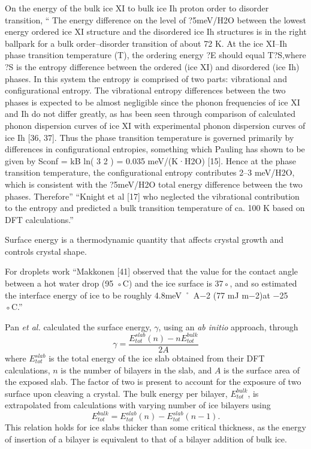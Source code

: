 On the energy of the bulk ice XI to bulk ice Ih proton order to
disorder transition, `` The energy difference on the level of
?5meV/H2O between the lowest energy ordered ice XI structure and the
disordered ice Ih structures is in the right ballpark for a bulk
order–disorder transition of about 72 K. At the ice XI–Ih phase
transition temperature (T), the ordering energy ?E should equal
T?S,where ?S is the entropy difference between the ordered (ice XI)
and disordered (ice Ih) phases. In this system the entropy is
comprised of two parts: vibrational and configurational entropy. The
vibrational entropy differences between the two phases is expected to
be almost negligible since the phonon frequencies of ice XI and Ih do
not differ greatly, as has been seen through comparison of calculated
phonon dispersion curves of ice XI with experimental phonon dispersion
curves of ice Ih [36, 37]. Thus the phase transition temperature is
governed primarily by differences in configurational entropies,
something which Pauling has shown to be given by Sconf = kB ln( 3 2 )
= 0.035 meV/(K·H2O) [15].  Hence at the phase transition temperature,
the configurational entropy contributes 2–3 meV/H2O, which is
consistent with the ?5meV/H2O total energy difference between the two
phases. Therefore'' ``Knight et al [17] who neglected the vibrational
contribution to the entropy and predicted a bulk transition
temperature of ca. 100 K based on DFT calculations.''

Surface energy is a thermodynamic quantity that affects crystal growth
and controls crystal shape.

For droplets work ``Makkonen [41] observed that the value for the
contact angle between a hot water drop (95 ◦C) and the ice surface is
37◦, and so estimated the interface energy of ice to be roughly 4.8meV
˚ A−2 (77 mJ m−2)at −25 ◦C.''


Pan \textit{et al.} calculated the surface energy, $\gamma$, using an
\textit{ab initio} approach, through
\begin{equation}\label{PanSurfaceEnergy}
\gamma = \frac{E_{tot}^{slab}(n) - nE_{tot}^{bulk}}{2A}
\end{equation}
where $E_{tot}^{slab}$ is the total energy of the ice slab obtained
from their DFT calculations, $n$ is the number of bilayers in the
slab, and $A$ is the surface area of the exposed slab. The factor of
two is present to account for the exposure of two surface upon
cleaving a crystal. The bulk energy per bilayer, $E_{tot}^{bulk}$, is
extrapolated from calculations with varying number of ice bilayers
using 
\begin{equation}
E_{tot}^{bulk} = E_{tot}^{slab}(n) - E_{tot}^{slab}(n-1).
\end{equation}
This relation holds for ice slabs thicker than some critical
thickness, as the energy of insertion of a bilayer is equivalent to
that of a bilayer addition of bulk ice.

